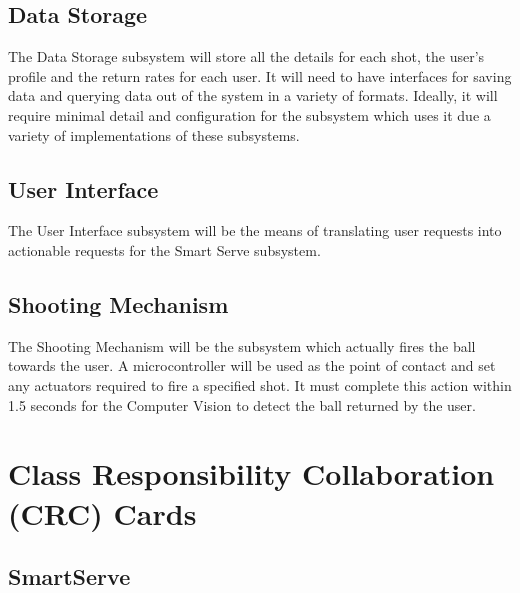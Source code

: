 \documentclass[11pt]{article}
\begin{document}
\subsection{Data Storage}
The Data Storage subsystem will store all the details for each shot, the user's profile and the return rates for each user. It will need to have interfaces for saving data and querying data out of the system in a variety of formats. Ideally, it will require minimal detail and configuration for the subsystem which uses it due a variety of implementations of these subsystems. 
\subsection{User Interface}
The User Interface subsystem will be the means of translating user requests into actionable requests for the Smart Serve subsystem.
\subsection{Shooting Mechanism}
The Shooting Mechanism will be the subsystem which actually fires the ball towards the user. A microcontroller will be used as the point of contact and set any actuators required to fire a specified shot. It must complete this action within 1.5 seconds for the Computer Vision to detect the ball returned by the user. 
\section{Class Responsibility Collaboration (CRC) Cards}
\subsection{SmartServe}
\end{document}
